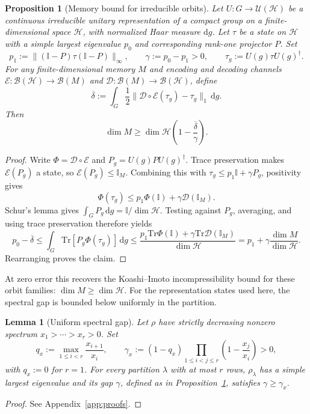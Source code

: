 \documentclass[a4paper,onecolumn,11pt]{quantumarticle}
\newtheorem{lem}{Lemma}
\newtheorem{prop}{Proposition}
\newcommand{\dd}{\mathrm{d}}
\def\h{\mathcal{H}}
\def\id{\mathbb{I}}
\newcommand*{\Tr}{\mathrm{Tr}}
\def\D{\mathcal{D}}
\def\E{\mathcal{E}}
\begin{document}
\begin{prop}[Memory bound for irreducible orbits]\label{prop:compact_orbit_memory}
Let $U:G\to\mathcal U(\h)$ be a continuous irreducible unitary
representation of a compact group on a finite-dimensional space
$\h$, with normalized Haar measure $\dd g$. Let $\tau$ be a state
on $\h$ with a simple largest
eigenvalue $p_0$ and corresponding rank-one projector $P$. Set
\[
p_1:=\|(\id-P)\tau(\id-P)\|_\infty,\qquad
\gamma:=p_0-p_1>0,\qquad
\tau_g:=U(g)\tau U(g)^\dagger.
\]
For any finite-dimensional memory $M$ and encoding and decoding channels
$\E:\mathcal B(\h)\to\mathcal B(M)$ and
$\D:\mathcal B(M)\to\mathcal B(\h)$, define
\[
\overline\delta:=
\int_G\frac12\|\D\circ\E(\tau_g)-\tau_g\|_1\,\dd g.
\]
Then
\begin{equation}\label{eq:compact_orbit_memory}
\dim M\ge\dim\h\left(1-\frac{\overline\delta}{\gamma}\right).
\end{equation}
\end{prop}
\begin{proof}
Write $\Phi=\D\circ\E$ and $P_g=U(g)PU(g)^\dagger$.
Trace preservation makes $\E(P_g)$ a state, so
$\E(P_g)\le\id_M$. Combining this with
$\tau_g\le p_1\id+\gamma P_g$, positivity gives
\[
\Phi(\tau_g)\le p_1\Phi(\id)+\gamma\D(\id_M).
\]
Schur's lemma gives $\int_G P_g\,\dd g=\id/\dim\h$. Testing against
$P_g$, averaging, and using trace preservation therefore yields
\[
p_0-\overline\delta
\le\int_G\Tr[P_g\Phi(\tau_g)]\,\dd g
\le\frac{p_1\Tr\Phi(\id)+\gamma\Tr\D(\id_M)}{\dim\h}
=p_1+\gamma\frac{\dim M}{\dim\h}.
\]
Rearranging proves the claim.
\end{proof}

At zero error this recovers the Koashi--Imoto incompressibility bound
for these orbit families: $\dim M\ge\dim\h$. For the representation
states used here, the spectral gap is bounded below uniformly in the
partition.

\begin{lem}[Uniform spectral gap]\label{lem:sector_gap}
Let $\rho$ have strictly decreasing nonzero spectrum
$x_1>\cdots>x_r>0$. Set
\[
q_x:=\max_{1\le i<r}\frac{x_{i+1}}{x_i},\qquad
\gamma_x:=(1-q_x)\prod_{1\le i<j\le r}
\left(1-\frac{x_j}{x_i}\right)>0,
\]
with $q_x:=0$ for $r=1$. For every partition $\lambda$ with at most
$r$ rows, $\rho_\lambda$ has a simple largest eigenvalue and its gap
$\gamma$, defined as in Proposition~\ref{prop:compact_orbit_memory},
satisfies $\gamma\ge\gamma_x$.
\end{lem}
\begin{proof}
See Appendix~\ref{app:proofs}.
\end{proof}
\end{document}
